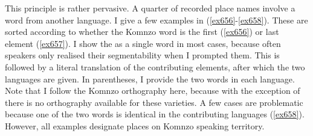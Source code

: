 This principle is rather pervasive. A quarter of recorded place names involve a word from another language. I give a few examples in (\ref{ex656}-\ref{ex658}). These are sorted according to whether the Komnzo word is the first (\ref{ex656}) or last element (\ref{ex657}). I show the  as a single word in most cases, because often speakers only realised their segmentability when I prompted them. This is followed by a literal  translation of the contributing elements, after which the two languages are given. In parentheses, I provide the two words in each language. Note that I follow the Komnzo orthography here, because with the exception of  there is no orthography available for these varieties. A few cases are problematic because one of the two words is identical in the contributing languages (\ref{ex658}). However, all examples designate places on Komnzo speaking territory.

